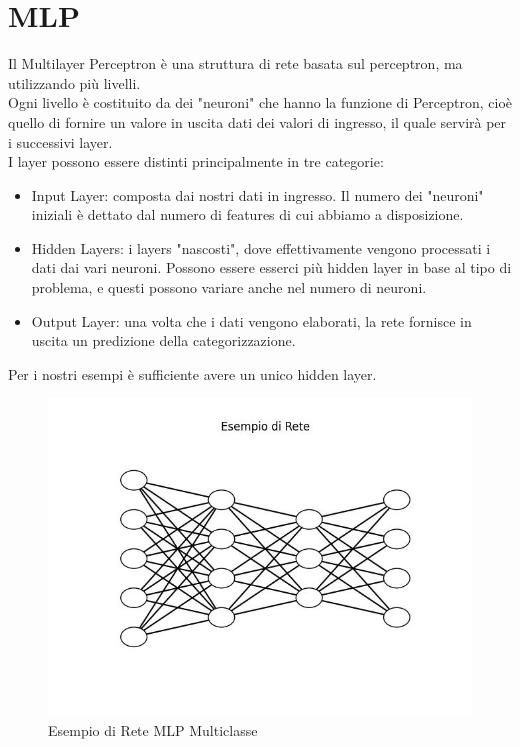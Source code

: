 \documentclass{article}
\begin{document}
    \section{MLP}\label{sec:mlp}
        Il Multilayer Perceptron è una struttura di rete basata sul perceptron, ma utilizzando più livelli.\\
        Ogni livello è costituito da dei "neuroni" che hanno la funzione di Perceptron, cioè quello di fornire un valore in uscita dati dei valori di ingresso, il quale servirà per i successivi layer. \\
        I layer possono essere distinti principalmente in tre categorie:
        \begin{itemize}
            \item Input Layer: composta dai nostri dati in ingresso.
            Il numero dei "neuroni" iniziali è dettato dal numero di features di cui abbiamo a disposizione.
            \item Hidden Layers: i layers "nascosti", dove effettivamente vengono processati i dati dai vari neuroni.
            Possono essere esserci più hidden layer in base al tipo di problema, e questi possono variare anche nel numero di neuroni.
            \item Output Layer: una volta che i dati vengono elaborati, la rete fornisce in uscita un predizione della categorizzazione.
        \end{itemize}
        Per i nostri esempi è sufficiente avere un unico hidden layer.
        \begin{figure}[H]
            \centering
            \includegraphics[scale=0.50]{neural_network}
            \caption{Esempio di Rete MLP Multiclasse}
            \label{fig:figure1}
        \end{figure}
\end{document}
